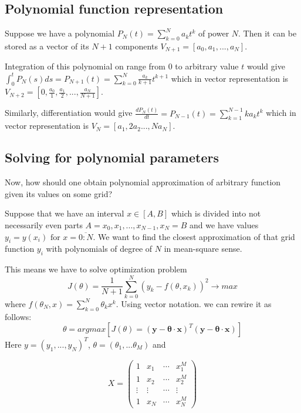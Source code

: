 \documentclass[11pt]{article} %
\begin{document}
\subsection{Polynomial function representation}
Suppose we have a polynomial $P_N(t) = \sum_{k=0}^N a_k t^k$ of power $N$. Then it can be stored as a vector of its $N+1$ components $V_{N+1} = [a_0, a_1, ..., a_N]$.

Integration of this polynomial on range from $0$ to arbitrary value $t$ would give $\int_0^t{P_N(s)ds} = P_{N+1}(t) = \sum_{k=0}^{N} \frac{a_k}{k+1} t^{k+1}$
which in vector representation is $V_{N+2} = \left[0, \frac{a_0}{1}, \frac{a_1}{2}, ..., \frac{a_N}{N+1}\right]$. 

Similarly, differentiation would give $\frac{dP_N(t)}{dt} = P_{N-1}(t) = \sum_{k=1}^{N-1} ka_k t^k$ which in vector representation is $V_{N} = \left[a_1, 2a_2 ..., Na_N\right]$.

\subsection{Solving for polynomial parameters}
Now, how should one obtain polynomial approximation of arbitrary function given its values on some grid? 

Suppose that we have an interval $x \in [A,B]$ which is divided into not necessarily even parts $A = x_0, x_1, ..., x_{N-1}, x_N = B$ and we have values $y_i = y(x_i) \text{ for } x = \overline{0:N}$. We want to find the closest approximation of that grid function $y_i$ with polynomials of degree of $N$ in mean-square sense. 

This means we have to solve optimization problem 
\begin{equation}
J(\theta) = \frac{1}{N+1}\sum_{k=0}^{N}\left(y_k-f(\theta,x_k)\right)^2 \to max
\end{equation} where $f(\theta_N,x) =  \sum_{k=0}^N \theta_k x^k$.
Using vector notation. we can rewire it as follows:
\begin{equation}
\theta = argmax\left[J(\theta) = \left(\mathbf{y}-\mathbf{\theta \cdot x}\right)^T\left(\mathbf{y}-\mathbf{\theta \cdot x}\right)\right]
\end{equation} 
Here $y = (y_1, ..., y_N)^T$, $\theta = (\theta_1,...\theta_M)$ and 

\begin{equation}
X = 
\begin{pmatrix}
1 & x_1 & \cdots & x_1^M \\
1 & x_2 & \cdots & x_2^M \\
\vdots & \vdots & \cdots & \vdots \\
1 & x_N & \cdots & x_N^M 
\end{pmatrix}
\nonumber
\end{equation} 
\end{document}
